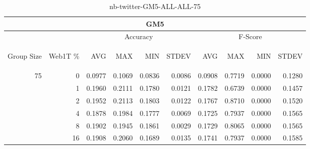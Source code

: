 \begin{center}
\begin{table}[htbp]
\begin{center}
\begin{tabular}{ | r | r | r | r | r | r | r | r | r | r |}
\hline
\multicolumn{10}{|c|}{GM5}\\
\hline
 & & \multicolumn{4}{|c|}{Accuracy} & \multicolumn{4}{|c|}{F-Score}\\ \cline{3-10}
\begin{sideways}Group Size\end{sideways} & \begin{sideways}Web1T \%\end{sideways} & \begin{sideways}AVG\end{sideways} & \begin{sideways}MAX\end{sideways} & \begin{sideways}MIN\end{sideways} & \begin{sideways}STDEV\end{sideways} & \begin{sideways}AVG\end{sideways} & \begin{sideways}MAX\end{sideways} & \begin{sideways}MIN\end{sideways} & \begin{sideways}STDEV\end{sideways}\\
\hline
\multirow{5}{*}{75}
 & 0 & 0.0977 & 0.1069 & 0.0836 & 0.0086 & 0.0908 & 0.7719 & 0.0000 & 0.1280\\ \cline{2-10}
 & 1 & 0.1960 & 0.2111 & 0.1780 & 0.0121 & 0.1782 & 0.6739 & 0.0000 & 0.1457\\ \cline{2-10}
 & 2 & 0.1952 & 0.2113 & 0.1803 & 0.0122 & 0.1767 & 0.8710 & 0.0000 & 0.1520\\ \cline{2-10}
 & 4 & 0.1878 & 0.1984 & 0.1777 & 0.0069 & 0.1725 & 0.7937 & 0.0000 & 0.1565\\ \cline{2-10}
 & 8 & 0.1902 & 0.1945 & 0.1861 & 0.0029 & 0.1729 & 0.8065 & 0.0000 & 0.1565\\ \cline{2-10}
 & 16 & 0.1908 & 0.2060 & 0.1689 & 0.0135 & 0.1741 & 0.7937 & 0.0000 & 0.1585\\ \cline{2-10}
\hline
\end{tabular}
\caption{nb-twitter-GM5-ALL-ALL-75}
\label{table:nb-twitter-GM5-ALL-ALL-75}
\end{center}
\end{table}
\end{center}

